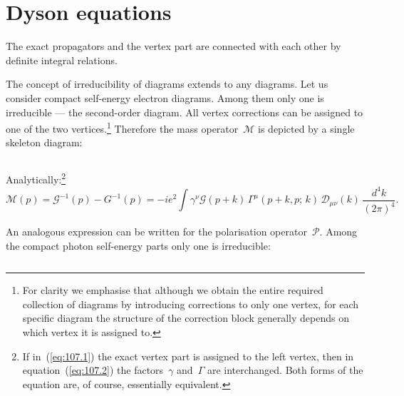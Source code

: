 
\section{Dyson equations}


The exact propagators and the vertex part are connected with each other by definite integral relations.

The concept of irreducibility of diagrams extends to any diagrams. Let us consider compact self-energy electron diagrams. Among them only one is irreducible --- the second-order diagram. All vertex corrections can be assigned to one of the two vertices.\footnote{For clarity we emphasise that although we obtain the entire required collection of diagrams by introducing corrections to only one vertex, for each specific diagram the structure of the correction block generally depends on which vertex it is assigned to.} Therefore the mass operator~$\mathcal{M}$ is depicted by a single skeleton diagram:

\begin{equation}
\label{eq:107.1}
\end{equation}

Analytically:\footnote{If in~(\ref{eq:107.1}) the exact vertex part is assigned to the left vertex, then in equation~(\ref{eq:107.2}) the factors~$\gamma$ and~$\Gamma$ are interchanged. Both forms of the equation are, of course, essentially equivalent.}
\begin{equation}
\mathcal{M}(p) = \mathcal{G}^{-1}(p) - G^{-1}(p) = -ie^2 \int \gamma^\nu \mathcal{G}(p+k)\,\Gamma^\mu(p+k,p;\,k)\,\mathcal{D}_{\mu\nu}(k)\,\frac{d^4k}{(2\pi)^4}.
\label{eq:107.2}
\end{equation}

An analogous expression can be written for the polarisation operator~$\mathcal{P}$. Among the compact photon self-energy parts only one is irreducible:

\begin{equation}
\label{eq:107.3}
\end{equation}

